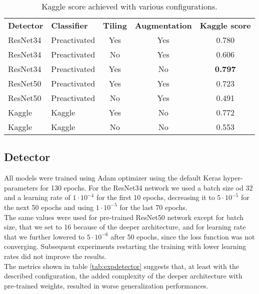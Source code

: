 \begin{table*}[h]
	\begin{tabular}{llccc}
		\rowcolor[HTML]{EFEFEF} 
		\textbf{Detector} & \textbf{Classifier} & \textbf{Tiling} & \textbf{Augmentation} & \textbf{Kaggle score} \\
		ResNet34          & Preactivated        & Yes             & Yes                   & 0.780                 \\
		ResNet34          & Preactivated        & No              & Yes                   & 0.606                 \\
		ResNet34          & Preactivated        & Yes             & No                    & \textbf{0.797}                      \\
		ResNet50          & Preactivated        & Yes             & Yes                   & 0.723                      \\
		ResNet50          & Preactivated        & No              & Yes                   & 0.491                 \\
		Kaggle            & Kaggle              & Yes             & No                   &  0.772                     \\
		Kaggle            & Kaggle              & No              & No                   & 0.553                     
	\end{tabular}
	\caption{Kaggle score achieved with various configurations.}
	\label{tab:finaltests}
\end{table*}

\subsection{Detector}
\label{ssec:detectorexp}

All models were trained using Adam optimizer using the default Keras hyper-parameters for 130 epochs. For the ResNet34 network we used a batch size od $32$ and a learning rate of $1 \cdot 10^{-4}$ for the first 10 epochs, decreasing it to $5 \cdot 10^{-5}$ for the next 50 epochs and using $1 \cdot 10^{-5}$ for the last 70 epochs. \\
The same values were used for pre-trained ResNet50 network except for batch size, that we set to 16 because of the deeper architecture, and for learning rate that we further lowered to $5 \cdot 10^{-6}$ after 50 epochs, since the loss function was not converging. Subsequent experiments restarting the training with lower learning rates did not improve the results.\\
The metrics shown in table \ref{tab:expdetector} suggests that, at least with the described configuration, the added complexity of the deeper architecture with pre-trained weights, resulted in worse generalization performances.

